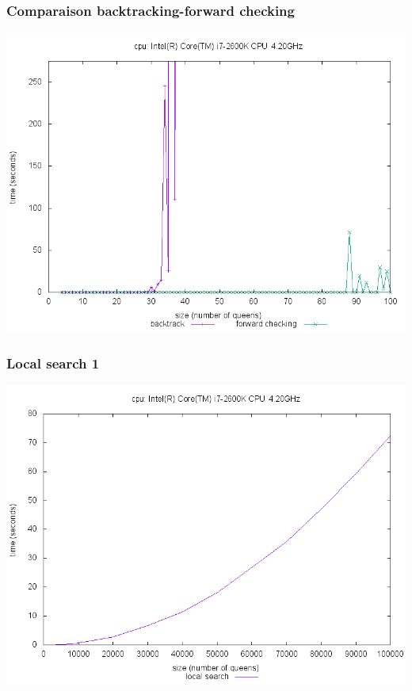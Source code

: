 \documentclass[9pt,a4paper]{beamer}
\begin{document}
\begin{frame}
	\frametitle{Comparaison backtracking-forward checking}
	\hspace{0.8cm} \includegraphics[height=0.9\textheight]{images/plot_bt_fw_i7.png}
\end{frame}

\begin{frame}
	\frametitle{Local search 1}

	\hspace{0.8cm} \includegraphics[height=0.9\textheight]{images/plot_ls_i7.png}
\end{frame}
\end{document}
